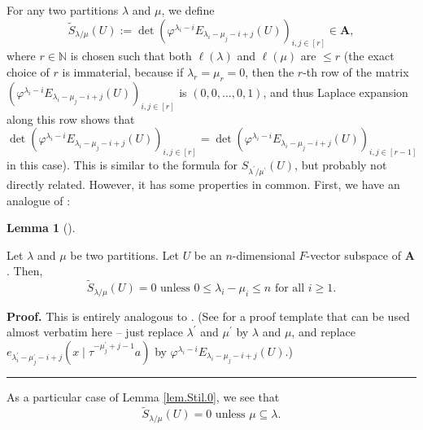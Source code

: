 \documentclass[numbers=enddot,12pt,final,onecolumn,notitlepage]{scrartcl}%
\numberwithin{exer}{section}
\theoremstyle{definition}
\newtheorem{lem}[theo]{Lemma}
\newenvironment{lemma}[1][]
{\begin{lem}[#1]\begin{leftbar}}
{\end{leftbar}\end{lem}}
\newenvironment{proof}[1][Proof]{\noindent\textbf{#1.} }{\ \rule{0.5em}{0.5em}}
\theoremstyle{plainsl}
\begin{document}
For any two partitions $\lambda$ and $\mu$, we define%
\begin{equation}
\widetilde{S}_{\lambda/\mu}\left(  U\right)  :=\det\left(  \varphi
^{\lambda_{i}-i}E_{\lambda_{i}-\mu_{j}-i+j}\left(  U\right)  \right)
_{i,j\in\left[  r\right]  }\in\mathbf{A}, \label{eq.Stil=}%
\end{equation}
where $r\in\mathbb{N}$ is chosen such that both $\ell\left(  \lambda\right)  $
and $\ell\left(  \mu\right)  $ are $\leq r$ (the exact choice of $r$ is
immaterial, because if $\lambda_{r}=\mu_{r}=0$, then the $r$-th row of the
matrix $\left(  \varphi^{\lambda_{i}-i}E_{\lambda_{i}-\mu_{j}-i+j}\left(
U\right)  \right)  _{i,j\in\left[  r\right]  }$ is $\left(  0,0,\ldots
,0,1\right)  $, and thus Laplace expansion along this row shows that
\[
\det\left(  \varphi^{\lambda_{i}-i}E_{\lambda_{i}-\mu_{j}-i+j}\left(
U\right)  \right)  _{i,j\in\left[  r\right]  }=\det\left(  \varphi
^{\lambda_{i}-i}E_{\lambda_{i}-\mu_{j}-i+j}\left(  U\right)  \right)
_{i,j\in\left[  r-1\right]  }%
\]
in this case). This is similar to the formula \cite[(7.11')]{Macdon92} for
$S_{\lambda^{\prime}/\mu^{\prime}}\left(  U\right)  $, but probably not
directly related. However, it has some properties in common. First, we have an
analogue of \cite[(7.12)]{Macdon92}:

\begin{lemma}
\label{lem.Stil.0}Let $\lambda$ and $\mu$ be two partitions. Let $U$ be an
$n$-dimensional $F$-vector subspace of $\mathbf{A}$. Then,
\begin{equation}
\widetilde{S}_{\lambda/\mu}\left(  U\right)  =0\text{ unless }0\leq\lambda
_{i}-\mu_{i}\leq n\text{ for all }i\geq1. \label{eq.Stilde.0}%
\end{equation}

\end{lemma}

\begin{proof}
This is entirely analogous to \cite[(7.12)]{Macdon92}. (See \cite[errata,
proof of (6.10)]{Macdon92} for a proof template that can be used almost
verbatim here -- just replace $\lambda^{\prime}$ and $\mu^{\prime}$ by
$\lambda$ and $\mu$, and replace $e_{\lambda_{i}^{\prime}-\mu_{j}^{\prime
}-i+j}\left(  x\mid\tau^{-\mu_{j}^{\prime}+j-1}a\right)  $ by $\varphi
^{\lambda_{i}-i}E_{\lambda_{i}-\mu_{j}-i+j}\left(  U\right)  $.)
\end{proof}

As a particular case of Lemma \ref{lem.Stil.0}, we see that
\begin{equation}
\widetilde{S}_{\lambda/\mu}\left(  U\right)  =0\text{ unless }\mu
\subseteq\lambda. \label{eq.Stilde.0ifnotsub}%
\end{equation}
\end{document}
